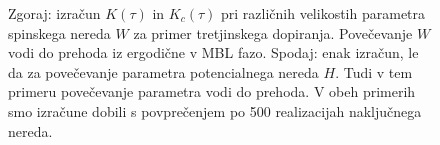 \begin{figure}[H]
\caption{Zgoraj: izračun $K(\tau)$ in $K_c(\tau)$ pri različnih velikostih parametra spinskega nereda $W$ za primer tretjinskega dopiranja. Povečevanje $W$ vodi do prehoda iz ergodične v MBL fazo. Spodaj: enak izračun, le da za povečevanje parametra potencialnega nereda $H$. Tudi v tem primeru povečevanje parametra vodi do prehoda. V obeh primerih smo izračune dobili s povprečenjem po 500 realizacijah naključnega nereda.  }
\label{fig:W_sweep_sff_disorder_9_3_3}
\end{figure} 
\newpage
